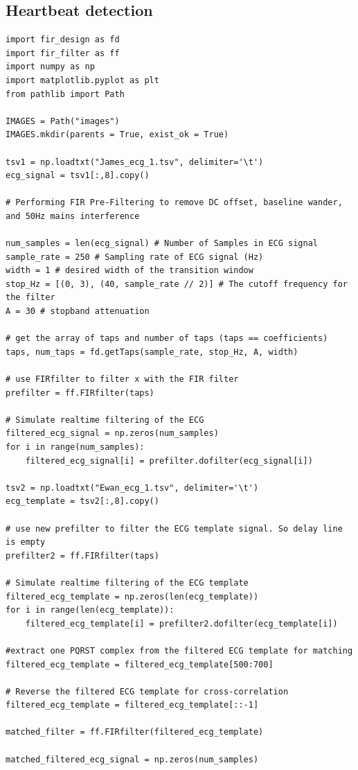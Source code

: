 \documentclass[8pt]{extarticle}
\begin{document}
\subsection{Heartbeat detection}
\begin{verbatim}
import fir_design as fd
import fir_filter as ff
import numpy as np
import matplotlib.pyplot as plt
from pathlib import Path

IMAGES = Path("images")
IMAGES.mkdir(parents = True, exist_ok = True)

tsv1 = np.loadtxt("James_ecg_1.tsv", delimiter='\t')
ecg_signal = tsv1[:,8].copy()

# Performing FIR Pre-Filtering to remove DC offset, baseline wander, and 50Hz mains interference

num_samples = len(ecg_signal) # Number of Samples in ECG signal
sample_rate = 250 # Sampling rate of ECG signal (Hz)
width = 1 # desired width of the transition window
stop_Hz = [(0, 3), (40, sample_rate // 2)] # The cutoff frequency for the filter
A = 30 # stopband attenuation

# get the array of taps and number of taps (taps == coefficients)
taps, num_taps = fd.getTaps(sample_rate, stop_Hz, A, width)

# use FIRfilter to filter x with the FIR filter
prefilter = ff.FIRfilter(taps)

# Simulate realtime filtering of the ECG
filtered_ecg_signal = np.zeros(num_samples)
for i in range(num_samples):
    filtered_ecg_signal[i] = prefilter.dofilter(ecg_signal[i])

tsv2 = np.loadtxt("Ewan_ecg_1.tsv", delimiter='\t')
ecg_template = tsv2[:,8].copy()

# use new prefilter to filter the ECG template signal. So delay line is empty
prefilter2 = ff.FIRfilter(taps)

# Simulate realtime filtering of the ECG template
filtered_ecg_template = np.zeros(len(ecg_template))
for i in range(len(ecg_template)):
    filtered_ecg_template[i] = prefilter2.dofilter(ecg_template[i])

#extract one PQRST complex from the filtered ECG template for matching
filtered_ecg_template = filtered_ecg_template[500:700]

# Reverse the filtered ECG template for cross-correlation
filtered_ecg_template = filtered_ecg_template[::-1]

matched_filter = ff.FIRfilter(filtered_ecg_template)

matched_filtered_ecg_signal = np.zeros(num_samples)


\end{verbatim}
\end{document}
